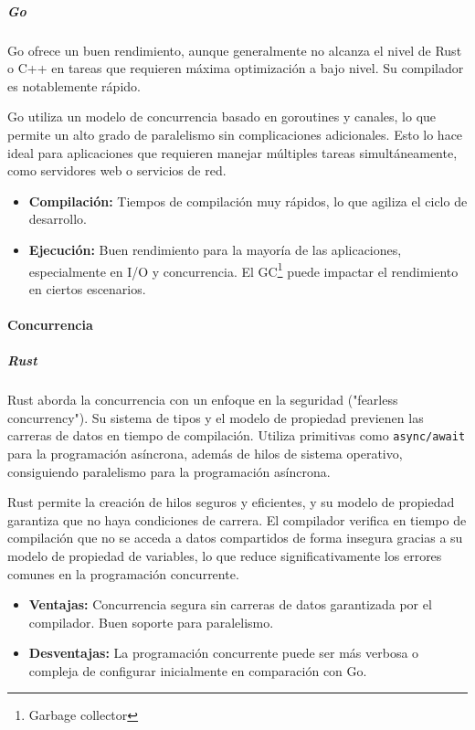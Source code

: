 \subparagraph{Go}
Go ofrece un buen rendimiento, aunque generalmente no alcanza el nivel de Rust o C++ en tareas que requieren máxima optimización a bajo nivel. Su compilador es notablemente rápido.

Go utiliza un modelo de concurrencia basado en goroutines y canales, lo que permite un alto grado de paralelismo sin complicaciones adicionales. Esto lo hace ideal para aplicaciones que requieren manejar múltiples tareas simultáneamente, como servidores web o servicios de red.

\begin{itemize}
    \item \textbf{Compilación:} Tiempos de compilación muy rápidos, lo que agiliza el ciclo de desarrollo.
    \item \textbf{Ejecución:} Buen rendimiento para la mayoría de las aplicaciones, especialmente en I/O y concurrencia. El GC\footnote{Garbage collector} puede impactar el rendimiento en ciertos escenarios.
\end{itemize}

\paragraph{Concurrencia}
\subparagraph{Rust}
Rust aborda la concurrencia con un enfoque en la seguridad ("fearless concurrency"). Su sistema de tipos y el modelo de propiedad previenen las carreras de datos en tiempo de compilación. Utiliza primitivas como \texttt{async/await} para la programación asíncrona, además de hilos de sistema operativo, consiguiendo paralelismo para la programación asíncrona.

Rust permite la creación de hilos seguros y eficientes, y su modelo de propiedad garantiza que no haya condiciones de carrera. El compilador verifica en tiempo de compilación que no se acceda a datos compartidos de forma insegura gracias a su modelo de propiedad de variables, lo que reduce significativamente los errores comunes en la programación concurrente.
\begin{itemize}
    \item \textbf{Ventajas:} Concurrencia segura sin carreras de datos garantizada por el compilador. Buen soporte para paralelismo.
    \item \textbf{Desventajas:} La programación concurrente puede ser más verbosa o compleja de configurar inicialmente en comparación con Go.
\end{itemize}

